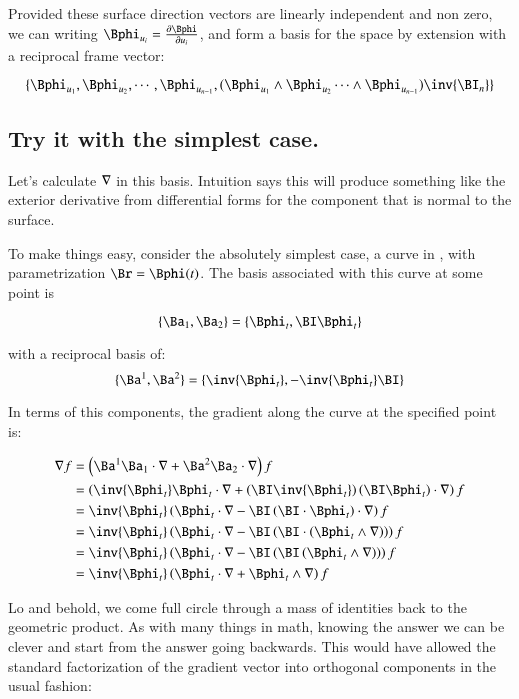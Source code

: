 Provided these surface direction vectors are linearly independent and non
zero, we can writing $\Bphi_{u_i} = \frac{\partial \Bphi}{ \partial u_i}$,
and form a basis for the space by extension with a reciprocal frame vector:

\[
\{ \Bphi_{u_1}, \Bphi_{u_2}, \cdots, \Bphi_{u_{n-1}}, 
(\Bphi_{u_1} \wedge \Bphi_{u_2} \cdots \wedge \Bphi_{u_{n-1}}) \inv{\BI_n}
 \}
\]

\subsection{Try it with the simplest case. }

Let's calculate $\nabla$ in this basis.  Intuition says this will
produce something like the exterior derivative from differential forms
for the component that is normal to the surface.

To make things easy, consider the absolutely simplest case, a curve
in , with parametrization $\Br = \Bphi(t)$.  The basis associated
with this curve at some point is

\[
\{ \Ba_1, \Ba_2 \} = \{ \Bphi_t, \BI \Bphi_t \}
\]

with a reciprocal basis of:
\[
\{ \Ba^1, \Ba^2 \} = \{ \inv{\Bphi_t}, -\inv{\Bphi_t} \BI \}
\]

In terms of this components, the gradient along the curve at the specified
point is:

\begin{align*}
\grad f
&= \left(\Ba^1 \Ba_1 \cdot \grad +\Ba^2 \Ba_2 \cdot \grad \right) f \\
&= \left(\inv{\Bphi_t} \Bphi_t \cdot \grad + \left( \BI \inv{\Bphi_t} \right) \left(\BI \Bphi_t \right) \cdot \grad \right) f \\
&= \inv{\Bphi_t}\left(\Bphi_t \cdot \grad -\BI \left(\BI \cdot \Bphi_t \right) \cdot \grad \right) f \\
&= \inv{\Bphi_t}\left(\Bphi_t \cdot \grad -\BI \left(\BI \cdot \left(\Bphi_t \wedge \grad \right) \right) \right) f \\
&= \inv{\Bphi_t}\left(\Bphi_t \cdot \grad -\BI \left(\BI \left(\Bphi_t \wedge \grad \right) \right) \right) f \\
&= \inv{\Bphi_t}\left(\Bphi_t \cdot \grad + \Bphi_t \wedge \grad \right) f \\
\end{align*}

Lo and behold, we come full circle through a mass of identities back to the geometric product.
As with many things in math, knowing the answer we can be clever and start from the answer going backwards.  This would have allowed the standard factorization of the gradient vector into 
orthogonal components in the usual fashion:

